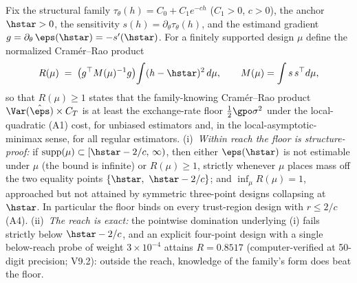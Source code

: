 \begin{theorem}
Fix the structural family $\tau_\theta(h) = C_0 + C_1 e^{-ch}$
($C_1 > 0$, $c > 0$), the anchor $\hstar > 0$, the sensitivity
$s(h) = \partial_\theta \tau_\theta(h)$, and the estimand gradient
$g = \partial_\theta\,\eps(\hstar) = -s'(\hstar)$. For a finitely
supported design $\mu$ define the normalized Cram\'er--Rao product
\[
R(\mu) \;=\; \big(g^\top M(\mu)^{-1} g\big)\!\int (h - \hstar)^2\,
d\mu, \qquad M(\mu) = \int s\,s^\top d\mu,
\]
so that $R(\mu) \ge 1$ states that the family-knowing Cram\'er--Rao
product $\Var(\hat\eps)\times C_T$ is at least the exchange-rate floor
$\tfrac{1}{2}\gpo\sigma^2$ under the local-quadratic (A1) cost, for
unbiased estimators and, in the local-asymptotic-minimax sense, for all
regular estimators.
(i)~\emph{Within reach the floor is structure-proof:} if
$\mathrm{supp}(\mu) \subset [\hstar - 2/c,\,\infty)$, then either
$\eps(\hstar)$ is not estimable under $\mu$ (the bound is infinite) or
$R(\mu) \ge 1$, strictly whenever $\mu$ places mass off the two
equality points $\{\hstar,\ \hstar - 2/c\}$; and $\inf_\mu R(\mu) = 1$,
approached but not attained by symmetric three-point designs collapsing
at $\hstar$. In particular the floor binds on every trust-region design
with $r \le 2/c$ (A4).
(ii)~\emph{The reach is exact:} the pointwise domination underlying (i)
fails strictly below $\hstar - 2/c$, and an explicit four-point design
with a single below-reach probe of weight $3\times 10^{-4}$ attains
$R = 0.8517$ (computer-verified at 50-digit precision; V9.2): outside
the reach, knowledge of the family's form does beat the floor.
\end{theorem}

